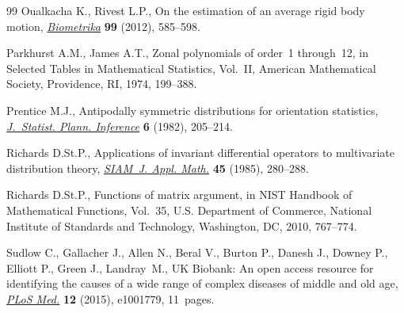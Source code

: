 \documentclass[pdftex]{sigma}
\numberwithin{equation}{section}
\begin{document}
\begin{thebibliography}{99}
Oualkacha K., Rivest L.P., On the estimation of an average rigid body motion,
 \href{https://doi.org/10.1093/biomet/ass020}{\textit{Biometrika}} \textbf{99} (2012), 585--598.

Parkhurst A.M., James A.T., Zonal polynomials of order~1 through~12, in
 Selected {T}ables in {M}athematical {S}tatistics, {V}ol.~{II}, American
 Mathematical Society, Providence, RI, 1974, 199--388.

Prentice M.J., Antipodally symmetric distributions for orientation statistics,
 \href{https://doi.org/10.1016/0378-3758(82)90025-8}{\textit{J.~Statist. Plann. Inference}} \textbf{6} (1982), 205--214.

Richards D.St.P., Applications of invariant differential operators to
 multivariate distribution theory, \href{https://doi.org/10.1137/0145015}{\textit{SIAM~J. Appl. Math.}} \textbf{45}
 (1985), 280--288.

Richards D.St.P., Functions of matrix argument, in N{IST} {H}andbook of
 {M}athematical {F}unctions, Vol.~35, U.S. Department of Commerce, National
 Institute of Standards and Technology, Washington, DC, 2010, 767--774.

Sudlow C., Gallacher J., Allen N., Beral V., Burton P., Danesh J., Downey P.,
 Elliott P., Green J., Landray~M., UK Biobank: An open access resource for
 identifying the causes of a wide range of complex diseases of middle and old
 age, \href{https://doi.org/10.1371/journal.pmed.1001779}{\textit{PLoS Med.}} \textbf{12} (2015), e1001779, 11~pages.

\end{thebibliography}\LastPageEnding
\end{document}

